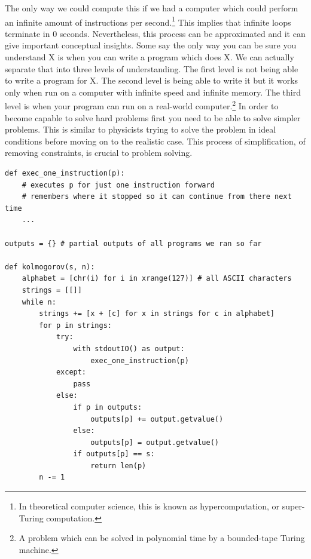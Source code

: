 The only way we could compute this if we had a computer which could perform an infinite amount of instructions per second.\footnote{In theoretical computer science, this is known as hypercomputation, or super-Turing computation.}
This implies that infinite loops terminate in 0 seconds.
Nevertheless, this process can be approximated and it can give important conceptual insights.
Some say the only way you can be sure you understand X is when you can write a program which does X.
We can actually separate that into three levels of understanding.
The first level is not being able to write a program for X.
The second level is being able to write it but it works only when run on a computer with infinite speed and infinite memory.
The third level is when your program can run on a real-world computer.\footnote{A problem which can be solved in polynomial time by a bounded-tape Turing machine.}
In order to become capable to solve hard problems first you need to be able to solve simpler problems.
This is similar to physicists trying to solve the problem in ideal conditions before moving on to the realistic case.
This process of simplification, of removing constraints, is crucial to problem solving.

\newpage

\begin{lstlisting}[caption={Approximating Kolmogorov complexity by limiting the number of instructions $n$ the programs are being executed, as well as the number of different programs which are being executed. As you run this for larger and larger $n$, the return value becomes smaller and smaller, until you reach $K(s)$ and the return value remains $K(s)$ from then on. We say that $K(x)$ is computable in the limit from above. If we were to modify this program so as to put a hard limit on the maximum program length, we could approximate the lower bound of $K(x)$.}]
def exec_one_instruction(p):
	# executes p for just one instruction forward 
	# remembers where it stopped so it can continue from there next time
	...

outputs = {} # partial outputs of all programs we ran so far

def kolmogorov(s, n):
	alphabet = [chr(i) for i in xrange(127)] # all ASCII characters
	strings = [[]]
	while n:
		strings += [x + [c] for x in strings for c in alphabet]
		for p in strings:
			try:
				with stdoutIO() as output:
					exec_one_instruction(p)
			except:
				pass
			else:
				if p in outputs:
					outputs[p] += output.getvalue()
				else:
					outputs[p] = output.getvalue()
				if outputs[p] == s:
					return len(p)
		n -= 1
\end{lstlisting}

